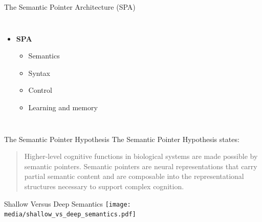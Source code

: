 \documentclass[handout,aspectratio=169]{beamer}
\begin{document}
	\begin{frame}{The Semantic Pointer Architecture (SPA)}
    \begin{columns}
      \centering
			\begin{itemize}
        \item \textbf{SPA}\\[.5cm]
				\begin{itemize}			
					\setlength{\itemsep}{0.5cm}
					\item Semantics
					\item Syntax
					\item Control
					\item Learning and memory
				\end{itemize}
			\end{itemize}
      \centering
    \end{columns}
	\end{frame}

  \begin{frame}{The Semantic Pointer Hypothesis}
    The Semantic Pointer Hypothesis states: \\ [0.5cm]
    \begin{quote}
    Higher-level cognitive functions in biological systems are made possible by semantic pointers. Semantic pointers are neural representations that carry partial semantic content and are composable into the representational structures necessary to support complex cognition.
    \end{quote}
	\end{frame}


	\begin{frame}{Shallow Versus Deep Semantics}
		\texttt{[image: media/shallow\_vs\_deep\_semantics.pdf]}
	\end{frame}
\end{document}
